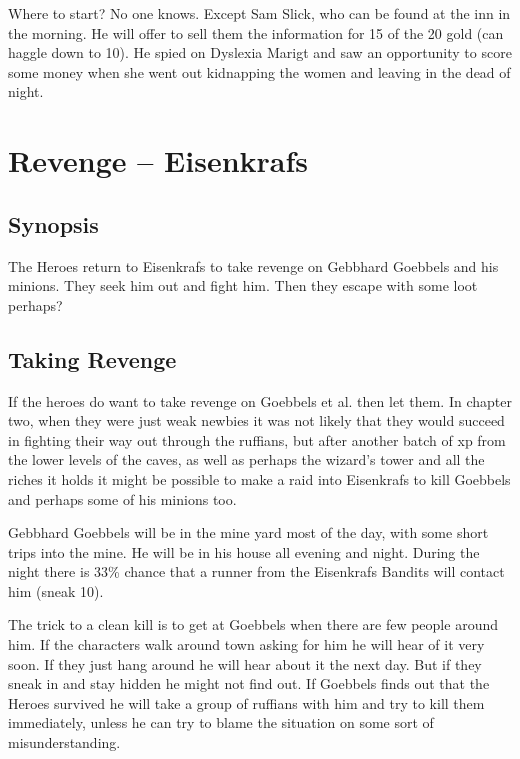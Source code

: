 Where to start? No one knows. Except Sam Slick, who can be found at the inn in the morning. He will offer to sell them the information for 15 of the 20 gold (can haggle down to 10). He spied on Dyslexia Marigt and saw an opportunity to score some money when she went out kidnapping the women and leaving in the dead of night.











\clearpage
{}
\section*{Revenge -- Eisenkrafs}


\subsection*{Synopsis}
The Heroes return to Eisenkrafs to take revenge on Gebbhard Goebbels and his minions. They seek him out and fight him. Then they escape with some loot perhaps?


\subsection*{Taking Revenge}
If the heroes do want to take revenge on Goebbels et al. then let them. In chapter two, when they were just weak newbies it was not likely that they would succeed in fighting their way out through the ruffians, but after another batch of xp from the lower levels of the caves, as well as perhaps the wizard's tower and all the riches it holds it might be possible to make a raid into Eisenkrafs to kill Goebbels and perhaps some of his minions too.

Gebbhard Goebbels will be in the mine yard most of the day, with some short trips into the mine. He will be in his house all evening and night. During the night there is 33\% chance that a runner from the Eisenkrafs Bandits will contact him (sneak 10).

The trick to a clean kill is to get at Goebbels when there are few people around him. If the characters walk around town asking for him he will hear of it very soon. If they just hang around he will hear about it the next day. But if they sneak in and stay hidden he might not find out. If Goebbels finds out that the Heroes survived he will take a group of ruffians with him and try to kill them immediately, unless he can try to blame the situation on some sort of misunderstanding.


